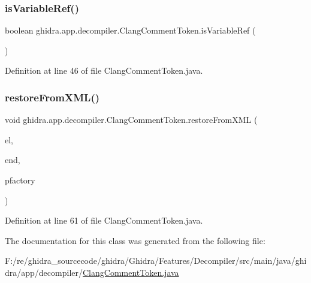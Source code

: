 \subsubsection{\texorpdfstring{isVariableRef()}{isVariableRef()}}
{\footnotesize\ttfamily boolean ghidra.\+app.\+decompiler.\+Clang\+Comment\+Token.\+is\+Variable\+Ref (\begin{DoxyParamCaption}{ }\end{DoxyParamCaption})\hspace{0.3cm}{\ttfamily [inline]}}



Definition at line 46 of file Clang\+Comment\+Token.\+java.

\mbox{\label{classghidra_1_1app_1_1decompiler_1_1_clang_comment_token_a4c624187ab1de19ccc2aaf7e9f659d99}} 
\subsubsection{\texorpdfstring{restoreFromXML()}{restoreFromXML()}}
{\footnotesize\ttfamily void ghidra.\+app.\+decompiler.\+Clang\+Comment\+Token.\+restore\+From\+X\+ML (\begin{DoxyParamCaption}\item[{Xml\+Element}]{el,  }\item[{Xml\+Element}]{end,  }\item[{Pcode\+Factory}]{pfactory }\end{DoxyParamCaption})\hspace{0.3cm}{\ttfamily [inline]}}



Definition at line 61 of file Clang\+Comment\+Token.\+java.



The documentation for this class was generated from the following file\+:\begin{DoxyCompactItemize}
\item 
F\+:/re/ghidra\+\_\+sourcecode/ghidra/\+Ghidra/\+Features/\+Decompiler/src/main/java/ghidra/app/decompiler/\mbox{\hyperlink{_clang_comment_token_8java}{Clang\+Comment\+Token.\+java}}\end{DoxyCompactItemize}

